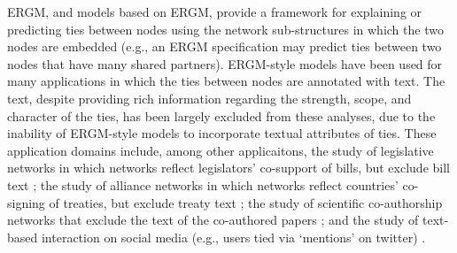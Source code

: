 \documentclass{article}
\begin{document}
ERGM, and models based on ERGM, provide a framework for explaining or predicting ties between nodes using the network sub-structures in which the two nodes are embedded (e.g., an ERGM specification may predict ties between two nodes that have many shared partners). ERGM-style models have been used for many applications in which the ties between nodes are annotated with text. The text, despite providing rich information regarding the strength, scope, and character of the ties, has been largely excluded from these analyses, due to the inability of ERGM-style models to incorporate textual attributes of ties. These application domains include, among other applicaitons, the study of legislative networks in which networks reflect legislators' co-support of bills, but exclude bill text \cite{bratton2011networks,aleman2013explaining}; the study of alliance networks in which networks reflect countries' co-signing of treaties, but exclude treaty text \cite{camber2010geometry,cranmer2012complex,cranmer2012toward,kinne2016agreeing}; the study of scientific co-authorship networks that exclude the text of the co-authored papers \cite{kronegger2011collaboration,liang2015changing,fahmy2016gender}; and the study of text-based interaction on social media (e.g., users tied via `mentions' on twitter) \cite{yoon2014strategies,peng2016follower,lai2017connecting}.
\end{document}
